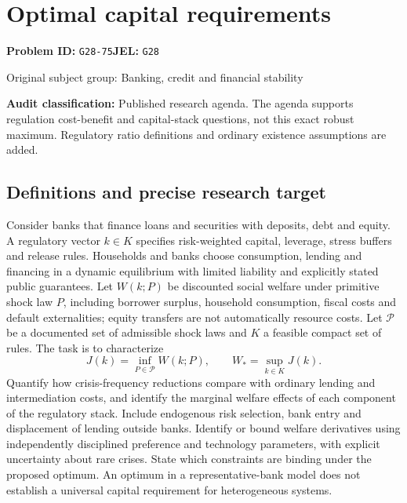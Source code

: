 \documentclass[11pt,a4paper]{article}
\begin{document}
\section*{Optimal capital requirements}
\textbf{Problem ID:} \texttt{G28-75}\quad \textbf{JEL:} \texttt{G28}\par
\label{problem:OP-0320}
{\sffamily\small\color{muted}Original subject group: Banking, credit and financial stability\par}
\label{definitions:problem:30007602}
\textbf{Audit classification:} Published research agenda. The agenda supports regulation cost-benefit and capital-stack questions, not this exact robust maximum. Regulatory ratio definitions and ordinary existence assumptions are added.
\subsection*{Definitions and precise research target}
Consider banks that finance loans and securities with deposits, debt and equity. A regulatory vector \(k\in K\) specifies risk-weighted capital, leverage, stress buffers and release rules. Households and banks choose consumption, lending and financing in a dynamic equilibrium with limited liability and explicitly stated public guarantees. Let \(W(k;P)\) be discounted social welfare under primitive shock law \(P\), including borrower surplus, household consumption, fiscal costs and default externalities; equity transfers are not automatically resource costs. Let \(\mathcal P\) be a documented set of admissible shock laws and \(K\) a feasible compact set of rules. The task is to characterize
\[J(k)=\inf_{P\in\mathcal P}W(k;P),\qquad W_*=\sup_{k\in K}J(k).\]
Quantify how crisis-frequency reductions compare with ordinary lending and intermediation costs, and identify the marginal welfare effects of each component of the regulatory stack. Include endogenous risk selection, bank entry and displacement of lending outside banks. Identify or bound welfare derivatives using independently disciplined preference and technology parameters, with explicit uncertainty about rare crises. State which constraints are binding under the proposed optimum. An optimum in a representative-bank model does not establish a universal capital requirement for heterogeneous systems.
\end{document}
